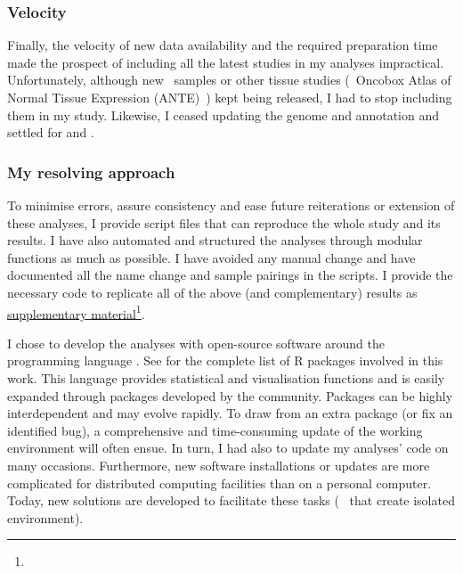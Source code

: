 \subsubsection*{Velocity}
\vspace{-3mm}
Finally, the velocity of new data availability
and the required preparation time
made the prospect of including all the latest studies in my analyses impractical.
Unfortunately, although new \gtex\ samples or other tissue studies
(\eg\ Oncobox Atlas of Normal Tissue Expression (ANTE)~)
kept being released,
I had to stop including them in my study.
Likewise, I ceased updating the genome and annotation
and settled for  and .\mybr\

\subsubsection*{My resolving approach}
\vspace{-3mm}
To minimise errors,
assure consistency and ease future reiterations or extension of these analyses,
I provide script files that can reproduce the whole study and its results.
I have also automated and structured the analyses through modular functions
as much as possible.
I have avoided any manual change and
have documented all the name change and sample pairings in the scripts.
I provide the necessary code to replicate all of the above (and complementary) results
as \href{https://github.com/barzine/BaselineAtlas/tree/thesis.}{supplementary
material}\footnote{}.\mybr\

I chose to develop the analyses with open-source software
around the programming language .
See  for the complete list of \textsf{R} packages
involved in this work.
This language provides statistical and visualisation functions
and is easily expanded through packages developed by the community.
Packages can be highly interdependent and may evolve rapidly.
To draw from an extra package (or fix an identified bug),
a comprehensive and time-consuming update of the working environment
will often ensue.
In turn, I had also to update my analyses' code on many occasions.
Furthermore, new software installations or updates are more complicated
for distributed computing facilities than on a personal computer.
Today, new solutions are developed to facilitate these tasks
(\eg\  that create isolated environment).\mybr\

